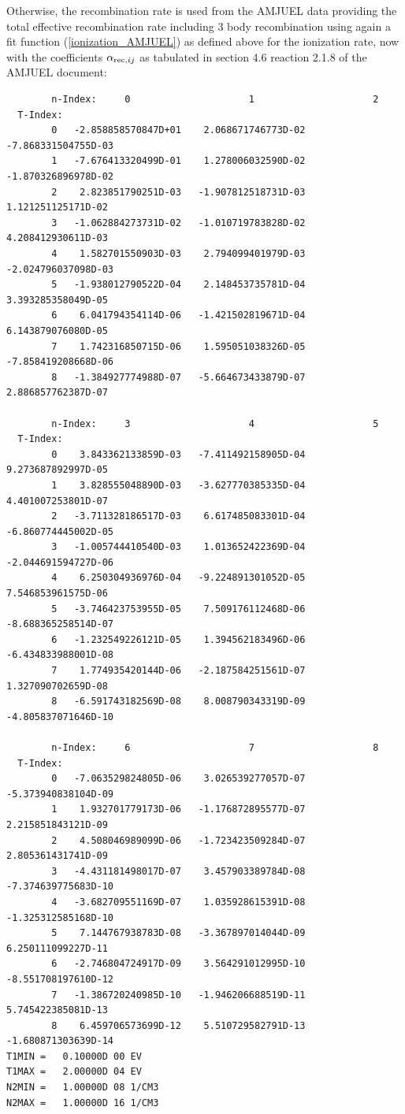 \documentclass[amsmath,amssymb,a4]{revtex4-2}
\begin{document}
Otherwise, the recombination rate is used from the AMJUEL data providing the total effective recombination rate including 3 body recombination using again a fit function (\ref{ionization_AMJUEL}) as defined above for the ionization rate, now with the coefficients $\alpha_{{\rm rec,} ij}$ as tabulated in section 4.6 reaction 2.1.8 of the AMJUEL document:
\begin{small}\begin{verbatim}
        n-Index:     0                     1                     2
  T-Index:
        0   -2.858858570847D+01    2.068671746773D-02   -7.868331504755D-03
        1   -7.676413320499D-01    1.278006032590D-02   -1.870326896978D-02
        2    2.823851790251D-03   -1.907812518731D-03    1.121251125171D-02
        3   -1.062884273731D-02   -1.010719783828D-02    4.208412930611D-03
        4    1.582701550903D-03    2.794099401979D-03   -2.024796037098D-03
        5   -1.938012790522D-04    2.148453735781D-04    3.393285358049D-05
        6    6.041794354114D-06   -1.421502819671D-04    6.143879076080D-05
        7    1.742316850715D-06    1.595051038326D-05   -7.858419208668D-06
        8   -1.384927774988D-07   -5.664673433879D-07    2.886857762387D-07

        n-Index:     3                     4                     5
  T-Index:
        0    3.843362133859D-03   -7.411492158905D-04    9.273687892997D-05
        1    3.828555048890D-03   -3.627770385335D-04    4.401007253801D-07
        2   -3.711328186517D-03    6.617485083301D-04   -6.860774445002D-05
        3   -1.005744410540D-03    1.013652422369D-04   -2.044691594727D-06
        4    6.250304936976D-04   -9.224891301052D-05    7.546853961575D-06
        5   -3.746423753955D-05    7.509176112468D-06   -8.688365258514D-07
        6   -1.232549226121D-05    1.394562183496D-06   -6.434833988001D-08
        7    1.774935420144D-06   -2.187584251561D-07    1.327090702659D-08
        8   -6.591743182569D-08    8.008790343319D-09   -4.805837071646D-10

        n-Index:     6                     7                     8
  T-Index:
        0   -7.063529824805D-06    3.026539277057D-07   -5.373940838104D-09
        1    1.932701779173D-06   -1.176872895577D-07    2.215851843121D-09
        2    4.508046989099D-06   -1.723423509284D-07    2.805361431741D-09
        3   -4.431181498017D-07    3.457903389784D-08   -7.374639775683D-10
        4   -3.682709551169D-07    1.035928615391D-08   -1.325312585168D-10
        5    7.144767938783D-08   -3.367897014044D-09    6.250111099227D-11
        6   -2.746804724917D-09    3.564291012995D-10   -8.551708197610D-12
        7   -1.386720240985D-10   -1.946206688519D-11    5.745422385081D-13
        8    6.459706573699D-12    5.510729582791D-13   -1.680871303639D-14
T1MIN =   0.10000D 00 EV
T1MAX =   2.00000D 04 EV
N2MIN =   1.00000D 08 1/CM3
N2MAX =   1.00000D 16 1/CM3
\end{verbatim}\end{small}
\end{document}
